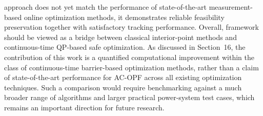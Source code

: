 \documentclass[11pt,onecolumn]{article}
\theoremstyle{definition}
\theoremstyle{remark}
\begin{document}
approach does not yet match the performance of state-of-the-art measurement-based online optimization methods, it demonstrates reliable feasibility preservation together with satisfactory tracking performance. Overall, framework should be viewed as a bridge between classical interior-point methods and continuous-time QP-based safe optimization. As discussed in Section~16, the contribution of this work is a quantified computational improvement within the class of continuous-time barrier-based optimization methods, rather than a claim of state-of-the-art performance for AC-OPF across all existing optimization techniques. Such a comparison would require benchmarking against a much broader range of algorithms and larger practical power-system test cases, which remains an important direction for future research.

\end{document}
